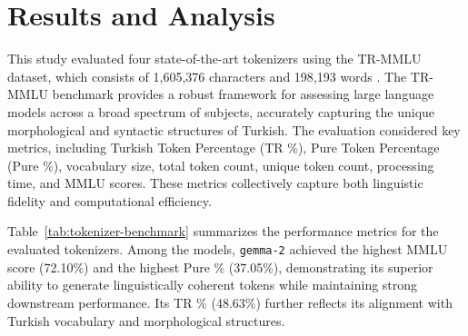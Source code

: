 \section{Results and Analysis}

This study evaluated four state-of-the-art tokenizers using the TR-MMLU dataset, which consists of 1,605,376 characters and 198,193 words \cite{bayram_setting_2025}. The TR-MMLU benchmark provides a robust framework for assessing large language models across a broad spectrum of subjects, accurately capturing the unique morphological and syntactic structures of Turkish. The evaluation considered key metrics, including Turkish Token Percentage (TR \%), Pure Token Percentage (Pure \%), vocabulary size, total token count, unique token count, processing time, and MMLU scores. These metrics collectively capture both linguistic fidelity and computational efficiency.

\begin{table}[h]
\centering
\caption{Tokenizer Benchmark Results}
\label{tab:tokenizer-benchmark}
\end{table}

Table~\ref{tab:tokenizer-benchmark} summarizes the performance metrics for the evaluated tokenizers. Among the models, \texttt{gemma-2} achieved the highest MMLU score (72.10\%) and the highest Pure \% (37.05\%), demonstrating its superior ability to generate linguistically coherent tokens while maintaining strong downstream performance. Its TR \% (48.63\%) further reflects its alignment with Turkish vocabulary and morphological structures.

